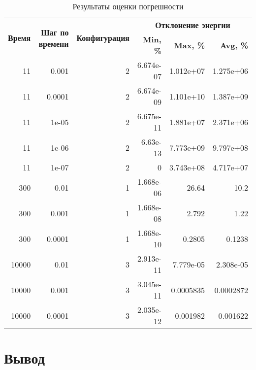 \begin{longtable}{|r|r|r|r|r|r|}
	\caption{Результаты оценки погрешности} \label{tbl:experiment} 
	\\
	\hline
	\multirow{2}{0.08\textwidth}{\textbf{Время}} & \multirow{2}{0.19\textwidth}{\textbf{Шаг по времени}} &  \multirow{2}{0.17\textwidth}{\textbf{Конфигурация}} & \multicolumn{3}{|c|}{\textbf{Отклонение энергии}} \\
	\cline{4-6} & & &
	 \multicolumn{1}{|p{0.14\textwidth}|}{\textbf{Min, \%}} & \multicolumn{1}{|p{0.14\textwidth}|}{\textbf{Max, \%}} & \multicolumn{1}{|p{0.14\textwidth}|}{\textbf{Avg, \%}} \\
	\hline
	\endfirsthead
	11 & 0.001 & 2 & 6.674e-07 & 1.012e+07 & 1.275e+06 \\ \hline
	11 & 0.0001 & 2 & 6.674e-09 & 1.101e+10 & 1.387e+09 \\ \hline
	11 & 1e-05 & 2 & 6.675e-11 & 1.881e+07 & 2.371e+06 \\ \hline
	11 & 1e-06 & 2 & 6.63e-13 & 7.773e+09 & 9.797e+08 \\ \hline
	11 & 1e-07 & 2 & 0 & 3.743e+08 & 4.717e+07 \\ \hline
	300 & 0.01 & 1 & 1.668e-06 & 26.64 & 10.2 \\ \hline
	300 & 0.001 & 1 & 1.668e-08 & 2.792 & 1.22 \\ \hline
	300 & 0.0001 & 1 & 1.668e-10 & 0.2805 & 0.1238 \\ \hline
	10000 & 0.01 & 3 & 2.913e-11 & 7.779e-05 & 2.308e-05 \\ \hline
	10000 & 0.001 & 3 & 3.045e-11 & 0.0005835 & 0.0002872 \\ \hline
	10000 & 0.0001 & 3 & 2.035e-12 & 0.001982 & 0.001622 \\ \hline

\end{longtable}

\section{Вывод}
\clearpage
